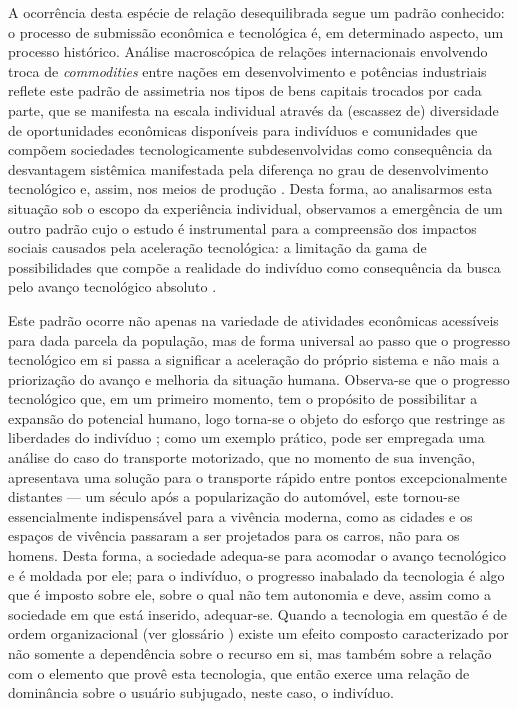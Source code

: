 A ocorrência desta espécie de relação desequilibrada segue um padrão conhecido: o processo de submissão
econômica e tecnológica é, em determinado aspecto, um processo histórico. Análise macroscópica de relações
internacionais envolvendo troca de \textit{commodities} entre nações em desenvolvimento e potências industriais reflete
este padrão de assimetria nos tipos de bens capitais trocados por cada parte, que se manifesta na escala individual
através da (escassez de) diversidade de oportunidades econômicas disponíveis para indivíduos e comunidades que compõem
sociedades tecnologicamente subdesenvolvidas como consequência da desvantagem sistêmica manifestada pela diferença no
grau de desenvolvimento tecnológico e, assim, nos meios de produção \cite[27-30]{secretariat1977}. Desta forma, ao
analisarmos esta situação sob o escopo da experiência individual, observamos a emergência de um outro padrão cujo o
estudo é instrumental para a compreensão dos impactos sociais causados pela aceleração tecnológica: a limitação da gama
de possibilidades que compõe a realidade do indivíduo como consequência da busca pelo avanço tecnológico absoluto
\cite[\S51]{kaczynski1995}.

Este padrão ocorre não apenas na variedade de atividades econômicas acessíveis para dada parcela da população, mas de
forma universal ao passo que o progresso tecnológico em si passa a significar a aceleração do próprio sistema e não mais
a priorização do avanço e melhoria da situação humana. Observa-se que o progresso tecnológico que, em um primeiro
momento, tem o propósito de possibilitar a expansão do potencial humano, logo torna-se o objeto do esforço que restringe
as liberdades do indivíduo \cite[\S127]{kaczynski1995}; como um exemplo prático, pode ser empregada uma análise do caso
do transporte motorizado, que no momento de sua invenção, apresentava uma solução para o transporte rápido entre pontos
excepcionalmente distantes --- um século após a popularização do automóvel, este tornou-se essencialmente indispensável
para a vivência moderna, como as cidades e os espaços de vivência passaram a ser projetados para os carros, não para os
homens. Desta forma, a sociedade adequa-se para acomodar o avanço tecnológico e é moldada por ele; para
o indivíduo, o progresso inabalado da tecnologia é algo que é imposto sobre ele, sobre o qual não tem autonomia e deve,
assim como a sociedade em que está inserido, adequar-se. Quando a tecnologia em questão é de ordem organizacional (ver
glossário \cite[\S207-212]{kaczynski1995}) existe um efeito composto caracterizado por não somente a dependência sobre o
recurso em si, mas também sobre a relação com o elemento que provê esta tecnologia, que então exerce uma relação de
dominância sobre o usuário subjugado, neste caso, o indivíduo.

